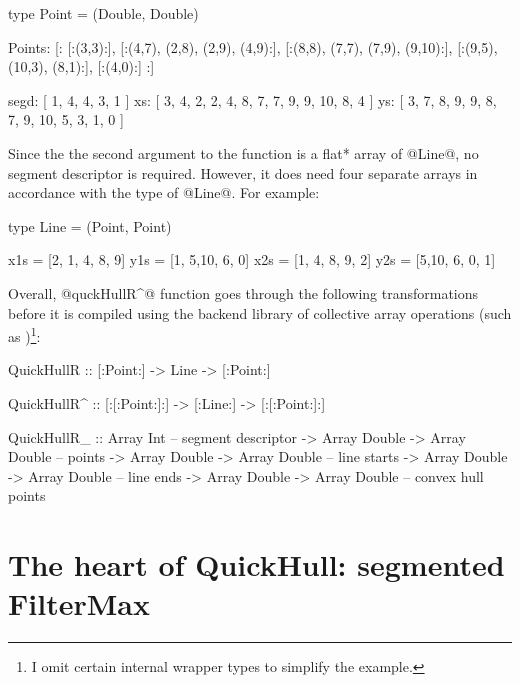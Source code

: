\documentclass[preamble.tex]{subfiles}
\begin{document}
\begin{hscode}
type Point = (Double, Double)

Points:
  [:
     [:(3,3):],
     [:(4,7), (2,8),  (2,9), (4,9):],
     [:(8,8), (7,7),  (7,9), (9,10):],
     [:(9,5), (10,3), (8,1):],
     [:(4,0):]
  :]


segd: [ 1, 4, 4, 3, 1 ]
xs:   [ 3, 4, 2, 2, 4, 8, 7, 7,  9, 9, 10, 8, 4 ]
ys:   [ 3, 7, 8, 9, 9, 8, 7, 9, 10, 5,  3, 1, 0 ]
\end{hscode}


Since the the second argument to the function is a \*flat* array of @Line@, no segment descriptor is required. However, it does need four separate arrays in accordance with the type of @Line@. For example:


\begin{hscode}
type Line = (Point, Point)

x1s = [2, 1, 4, 8, 9]
y1s = [1, 5,10, 6, 0]
x2s = [1, 4, 8, 9, 2]
y2s = [5,10, 6, 0, 1]
\end{hscode}


Overall, @quckHullR^@ function goes through the following transformations before it is compiled using the backend library of collective array operations (such as \LiveFusion)\footnote{I omit certain internal wrapper types to simplify the example.}:

\begin{hscode}[literate={^}{{$^\uparrow$}}1,]
QuickHullR  :: [:Point:] -> Line -> [:Point:]


QuickHullR^ :: [:[:Point:]:] -> [:Line:] -> [:[:Point:]:]


QuickHullR_ :: Array Int                      -- segment descriptor
            -> Array Double -> Array Double   -- points
            -> Array Double -> Array Double   -- line starts
            -> Array Double -> Array Double   -- line ends            
            -> Array Double -> Array Double   -- convex hull points
\end{hscode}



\section{The heart of QuickHull: segmented FilterMax}
\label{sec:FilterMax}
\end{document}
